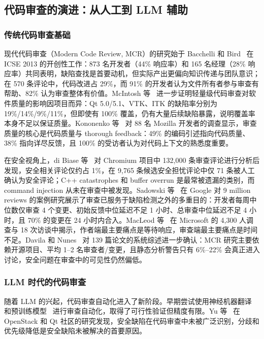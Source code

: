 \documentclass[11pt,a4paper,onecolumn]{article}
\begin{document}
\subsection{代码审查的演进：从人工到 LLM 辅助}

\subsubsection{传统代码审查基础}
现代代码审查（Modern Code Review, MCR）的研究始于 Bacchelli 和 Bird~\cite{bacchelli_bird_2013} 在 ICSE 2013 的开创性工作：873 名开发者（44\% 响应率）和 165 名经理（28\% 响应率）共同表明，缺陷查找是首要动机，但实际产出更偏向知识传递与团队意识；在 570 条评论中，代码改进占 29\%，而 91\% 的开发者认为文件所有者参与审查有帮助、82\% 认为审查整体有价值。McIntosh 等~\cite{mcintosh_2015_impact} 进一步证明轻量级代码审查对软件质量的影响因项目而异：Qt 5.0/5.1、VTK、ITK 的缺陷率分别为 19\%/14\%/9\%/11\%，但即使有 100\% 覆盖，仍有大量后续缺陷暴露，说明覆盖率本身不足以保证质量。Kononenko 等~\cite{kononenko_2016_review_quality} 对 88 名 Mozilla 开发者的调查显示，审查质量的核心是代码质量与 thorough feedback：49\% 的编码引述指向代码质量、38\% 指向详尽反馈，且 100\% 的受访者认为对代码上下文的熟悉度重要。

在安全视角上，di Biase 等~\cite{dibiase_2016_security_chromium} 对 Chromium 项目中 132,000 条审查评论进行分析后发现，安全相关评论仅约占 1\%，在 9,765 条候选安全担忧评论中仅 71 条被人工确认为安全评论；C++ catastrophes 和 buffer overrun 是最常被遗漏的类别，而 command injection 从未在审查中被发现。Sadowski 等~\cite{sadowski_2018_google} 在 Google 对 9 million reviews 的案例研究展示了审查已服务于缺陷检测之外的多重目的：开发者每周中位数仅审查 4 个变更、初始反馈中位延迟不足 1 小时、总审查中位延迟不足 4 小时，且 70\% 的变更在 24 小时内合入。MacLeod 等~\cite{macleod_2018_trenches} 在 Microsoft 的 4,300 人调查与 18 次访谈中揭示，作者端最主要痛点是等待响应，审查端最主要痛点是时间不足。Davila 和 Nunes~\cite{davila_nunes_2021_slr_taxonomy} 对 139 篇论文的系统综述进一步确认：MCR 研究主要依赖开源项目、平均 1--2 名审查者/变更，且静态分析警告只有 6\%--22\% 会真正进入讨论，安全问题在审查中的可见性仍然偏低。

\subsubsection{LLM 时代的代码审查}
随着 LLM 的兴起，代码审查自动化进入了新阶段。早期尝试使用神经机器翻译~\cite{tufano_2021_towards} 和预训练模型~\cite{li_2022_codereviewer,tufano_2022_pretrained} 进行审查自动化，取得了可行性验证但精度有限。Yu 等~\cite{yu_2023_security_defect} 在 OpenStack 和 Qt 社区的研究发现，安全缺陷在代码审查中未被广泛识别，分歧和优先级降低是安全缺陷未被解决的首要原因。
\end{document}

